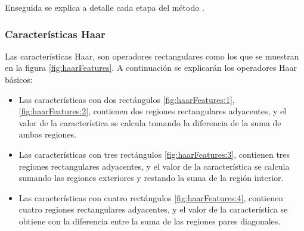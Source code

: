 Enseguida se explica a detalle cada etapa del método \citep{Viola2001}. 

\subsubsection{Características Haar}\label{sssec:CaracteristicasHaar}  

Las características Haar, son operadores rectangulares como los que se muestran en la figura \ref{fig:haarFeatures}. A continuación se explicarán los operadores Haar básicos:
\begin{itemize}
\item Las características con dos rectángulos \ref{fig:haarFeatures:1}, \ref{fig:haarFeatures:2}, contienen dos regiones rectangulares adyacentes, y el valor de la característica se calcula tomando la diferencia de la suma de ambas regiones. 

\item Las características con tres rectángulos \ref{fig:haarFeatures:3}, contienen tres regiones rectangulares adyacentes, y el valor de la característica se calcula sumando las regiones exteriores y restando la suma de la región interior.

\item Las características con cuatro rectángulos \ref{fig:haarFeatures:4}, contienen cuatro regiones rectangulares adyacentes, y el valor de la característica se obtiene con la diferencia entre la suma de las regiones pares diagonales.
\end{itemize} 

